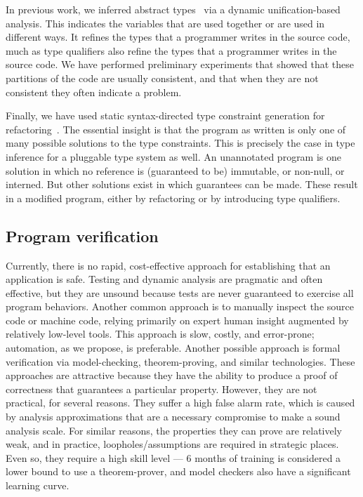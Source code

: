 \documentclass[preprint]{sig-alternate}
\begin{document}
In previous work, we inferred abstract types~\cite{GuoPME2006} via a
dynamic unification-based analysis.  This indicates the variables that are
used together or are used in different ways.  It refines the types that
a programmer writes in the source code, much as type qualifiers also refine
the types that a programmer writes in the source code.  We have performed
preliminary experiments that showed that these partitions of the code are
usually consistent, and that when they are not consistent they often
indicate a problem.

Finally, we have used static syntax-directed type constraint generation for
refactoring~\cite{DonovanKTE2004,KiezunETF2007}.  The essential insight is
that the program as written is only one of many possible solutions to the
type constraints.  This is precisely the case in type inference for a
pluggable type system as well.  An unannotated program is one solution in
which no reference is (guaranteed to be) immutable, or non-null, or
interned.  But other solutions exist in which guarantees can be made.
These result in a modified program, either by refactoring or by introducing
type qualifiers.


\subsection{Program verification}

Currently, there is no rapid, cost-effective approach for establishing that
an application is safe.  Testing and dynamic analysis are pragmatic and
often effective, but they are unsound because tests are never guaranteed
to exercise all program behaviors.
Another common approach is to manually inspect the source code
or machine code, relying primarily on expert human insight augmented by
relatively low-level tools.  This approach is slow, costly, and
error-prone; automation, as we propose, is preferable.  Another possible
approach is formal verification via model-checking, theorem-proving, and
similar technologies.  These approaches are attractive because they have
the ability to produce a proof of correctness that guarantees a particular
property.  However, they are not practical, for several reasons.  They
suffer a high false alarm rate, which is caused by analysis approximations
that are a necessary compromise to make a sound analysis scale.  For
similar reasons, the properties they can prove are relatively weak, and in
practice, loopholes/assumptions are required in strategic places.  Even so, they
require a high skill level --- 6 months of training is considered a lower
bound to use a theorem-prover, and model checkers also have a significant
learning curve.
\end{document}
